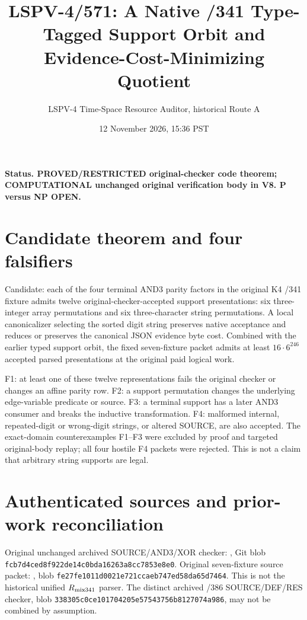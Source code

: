 \documentclass[11pt]{article}
\title{LSPV-4/571: A Native /341 Type-Tagged Support Orbit and Evidence-Cost-Minimizing Quotient}
\author{LSPV-4 Time-Space Resource Auditor, historical Route A}
\date{12 November 2026, 15:36 PST}
\begin{document}
\maketitle
\noindent\textbf{Status. PROVED/RESTRICTED original-checker code theorem; COMPUTATIONAL unchanged original verification body in V8. P versus NP OPEN.}

\section*{Candidate theorem and four falsifiers}
Candidate: each of the four terminal AND3 parity factors in the original K4 /341 fixture admits twelve original-checker-accepted support presentations: six three-integer array permutations and six three-character string permutations. A local canonicalizer selecting the sorted digit string preserves native acceptance and reduces or preserves the canonical JSON evidence byte cost. Combined with the earlier typed support orbit, the fixed seven-fixture packet admits at least $16\cdot6^{246}$ accepted parsed presentations at the original paid logical work.

\noindent F1: at least one of these twelve representations fails the original checker or changes an affine parity row. F2: a support permutation changes the underlying edge-variable predicate or source. F3: a terminal support has a later AND3 consumer and breaks the inductive transformation. F4: malformed internal, repeated-digit or wrong-digit strings, or altered SOURCE, are also accepted. The exact-domain counterexamples F1--F3 were excluded by proof and targeted original-body replay; all four hostile F4 packets were rejected. This is not a claim that arbitrary string supports are legal.

\section*{Authenticated sources and prior-work reconciliation}
Original unchanged archived SOURCE/AND3/XOR checker: , Git blob \texttt{fcb7d4ced8f922de14c0bda16263a8cc7853e8e0}. Original seven-fixture source packet: , blob \texttt{fe27fe1011d0021e721ccaeb747ed58da65d7464}. This is not the historical unified $R_{\rm mix341}$ parser. The distinct archived /386 SOURCE/DEF/RES checker, blob \texttt{338305c0ce101704205e57543756b8127074a986}, may not be combined by assumption.
\end{document}
